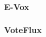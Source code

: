 \documentclass[9pt,oneside]{amsart}
\begin{document}
\begin{multicols}{2}
\subsubsection{E-Vox}

\subsubsection{VoteFlux}


\end{multicols}
\end{document}
